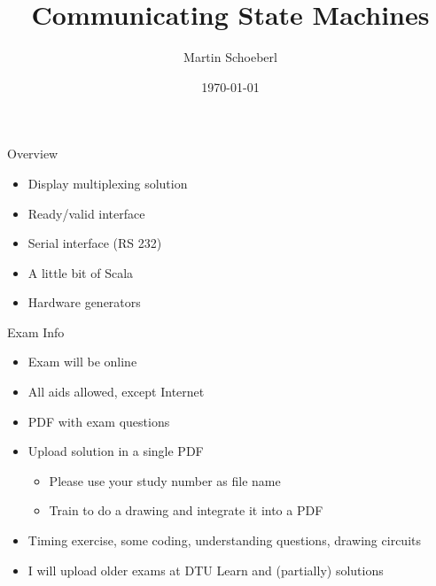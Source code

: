 

\newif\ifbook


\title{Communicating State Machines}
\author{Martin Schoeberl}
\date{\today}



\begin{frame}
\titlepage
\end{frame}



\begin{frame}[fragile]{Overview}
\begin{itemize}
\item Display multiplexing solution
\item Ready/valid interface
\item Serial interface (RS 232)
\item A little bit of Scala
\item Hardware generators
\end{itemize}
\end{frame}

\begin{frame}[fragile]{Exam Info}
\begin{itemize}
\item Exam will be online
\item All aids allowed, except Internet
\item PDF with exam questions
\item Upload solution in a single PDF
\begin{itemize}
\item Please use your study number as file name
\item Train to do a drawing and integrate it into a PDF
\end{itemize}
\item Timing exercise, some coding, understanding questions, drawing circuits
\item I will upload older exams at DTU Learn and (partially) solutions
\end{itemize}
\end{frame}


